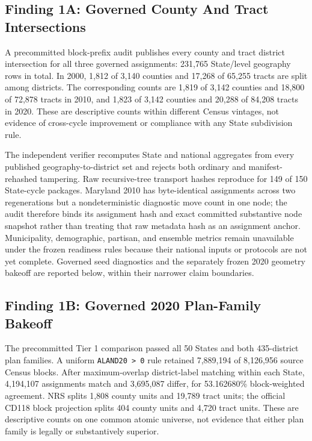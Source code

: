 \subsection{Finding 1A: Governed County And Tract Intersections}

A precommitted block-prefix audit publishes every county and tract district
intersection for all three governed assignments: 231,765 State/level geography
rows in total. In 2000, 1,812 of 3,140 counties and 17,268 of 65,255 tracts are
split among districts. The corresponding counts are 1,819 of 3,142 counties
and 18,800 of 72,878 tracts in 2010, and 1,823 of 3,142 counties and 20,288 of
84,208 tracts in 2020. These are descriptive counts within different Census
vintages, not evidence of cross-cycle improvement or compliance with any
State subdivision rule.

The independent verifier recomputes State and national aggregates from every
published geography-to-district set and rejects both ordinary and
manifest-rehashed tampering. Raw recursive-tree transport hashes reproduce for
149 of 150 State-cycle packages. Maryland 2010 has byte-identical assignments
across two regenerations but a nondeterministic diagnostic move count in one
node; the audit therefore binds its assignment hash and exact committed
substantive node snapshot rather than treating that raw metadata hash as an
assignment anchor. Municipality, demographic, partisan, and ensemble metrics
remain unavailable under the frozen readiness rules because their national
inputs or protocols are not yet complete. Governed seed diagnostics and the
separately frozen 2020 geometry bakeoff are reported below, within their
narrower claim boundaries.

\subsection{Finding 1B: Governed 2020 Plan-Family Bakeoff}

The precommitted Tier 1 comparison passed all 50 States and both 435-district
plan families. A uniform \texttt{ALAND20 > 0} rule retained 7,889,194 of
8,126,956 source Census blocks. After maximum-overlap district-label matching
within each State, 4,194,107 assignments match and 3,695,087 differ, for
53.162680\% block-weighted agreement. NRS splits 1,808 county units and 19,789
tract units; the official CD118 block projection splits 404 county units and
4,720 tract units. These are descriptive counts on one common atomic universe,
not evidence that either plan family is legally or substantively superior.

